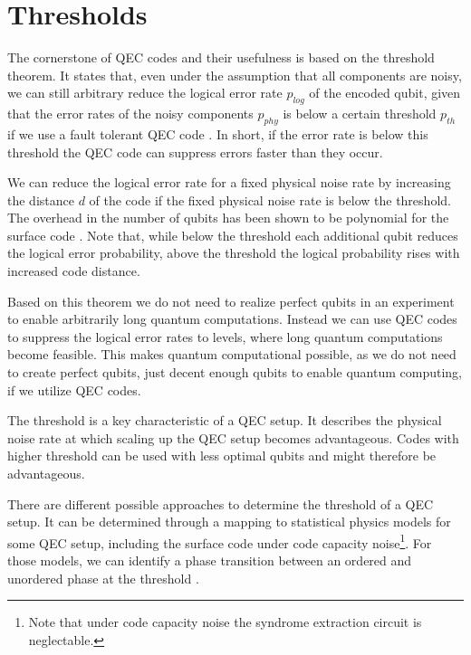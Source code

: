 

\chapter{Thresholds}\label{ssec:threshold_theorem}

The cornerstone of QEC codes and their usefulness is based on the threshold theorem. 
It states that, even under the assumption that all components are noisy,
we can still arbitrary reduce the logical error rate $p_{log}$ of the encoded qubit, 
given that the error rates of the noisy components $p_{phy}$ is below a certain threshold $p_{th}$ if we use a fault tolerant QEC code \cite{gottesmann_book,topological_quantum_memory}.
In short, if the error rate is below this threshold the QEC code can suppress errors faster than they occur.

We can reduce the logical error rate for a fixed physical noise rate by increasing the distance $d$ of the code if the fixed physical noise rate is below the threshold.
The overhead in the number of qubits has been shown to be polynomial for the surface code \cite{topological_quantum_memory}.
Note that, while below the threshold each additional qubit reduces the logical error probability, above the threshold the logical probability rises with increased code distance.

Based on this theorem we do not need to realize perfect qubits in an experiment to enable arbitrarily long quantum computations.
Instead we can use QEC codes to suppress the logical error rates to levels, where long quantum computations become feasible.  
This makes quantum computational possible, as we do not need to create perfect qubits, just decent enough qubits to enable quantum computing, if we utilize QEC codes.

The threshold is a key characteristic of a QEC setup.
It describes the physical noise rate at which scaling up the QEC setup becomes advantageous.
Codes with higher threshold can be used with less optimal qubits and might therefore be advantageous.

There are different possible approaches to determine the threshold of a QEC setup.
It can be determined through a mapping to statistical physics models for some QEC setup, including the surface code under code capacity noise\footnote{Note that under code capacity noise the syndrome extraction circuit is neglectable.}.
For those models, we can identify a phase transition between an ordered and unordered phase at the threshold \cite{fundamental_thresholds,topological_quantum_memory}.

